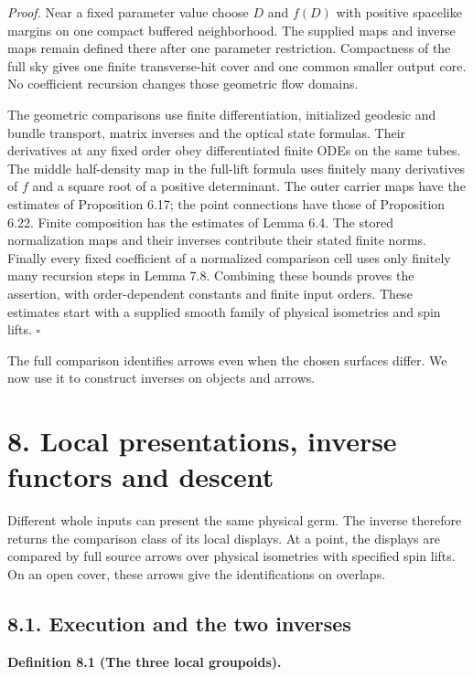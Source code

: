 \documentclass[
  english,
  11pt,
  reqno]{amsart}
\makeatletter
\newcommand{\paperdisplaynext}{%
  \let\paper@savedstartsection\@startsection
  \def\@startsection##1##2##3##4##5##6{%
    \let\@startsection\paper@savedstartsection
    \@tempskipa ##5\relax
    \ifdim\@tempskipa<\z@
      \def\paper@afterskip{.35\baselineskip}%
    \else
      \def\paper@afterskip{##5}%
    \fi
    \@startsection{##1}{##2}{##3}{##4}{\paper@afterskip}{##6}}}
\newcommand{\paperdisplaysection}{\paperdisplaynext\subsection}
\newcommand{\pandocstatementheading}[1]{%
  \par\if@nobreak\else
    \addpenalty{\@beginparpenalty}%
    \addvspace{.5\baselineskip plus .2\baselineskip minus .2\baselineskip}%
  \fi
  {\normalfont\bfseries #1\par}%
  \nobreak\@afterindenttrue\@afterheading
}
\let\paper@displaysection\paperdisplaysection
\renewcommand{\paperdisplaysection}[1]{%
  \let\paper@savedhangfrom\@hangfrom
  \long\def\@hangfrom##1##2{%
    \paper@savedhangfrom{##1}{\paper@headingparagraph##2}}%
  \paper@displaysection{#1}%
  \let\@hangfrom\paper@savedhangfrom}
\makeatother
\begin{document}
\emph{Proof.} Near a fixed parameter value choose \(D\) and \(f(D)\)
with positive spacelike margins on one compact buffered neighborhood.
The supplied maps and inverse maps remain defined there after one
parameter restriction. Compactness of the full sky gives one finite
transverse-hit cover and one common smaller output core. No coefficient
recursion changes those geometric flow domains.

The geometric comparisons use finite differentiation, initialized
geodesic and bundle transport, matrix inverses and the optical state
formulas. Their derivatives at any fixed order obey differentiated
finite ODEs on the same tubes. The middle half-density map in the
full-lift formula uses finitely many derivatives of \(f\) and a square
root of a positive determinant. The outer carrier maps have the
estimates of Proposition 6.17; the point connections have those of
Proposition 6.22. Finite composition has the estimates of Lemma 6.4. The
stored normalization maps and their inverses contribute their stated
finite norms. Finally every fixed coefficient of a normalized comparison
cell uses only finitely many recursion steps in Lemma 7.8. Combining
these bounds proves the assertion, with order-dependent constants and
finite input orders. These estimates start with a supplied smooth family
of physical isometries and spin lifts. \hfill\(\square\)

The full comparison identifies arrows even when the chosen surfaces
differ. We now use it to construct inverses on objects and arrows.

\section{8. Local presentations, inverse functors and
descent}\label{local-presentations-inverse-functors-and-descent}\label{sec:local-source-equivalence}

Different whole inputs can present the same physical germ. The inverse
therefore returns the comparison class of its local displays. At a
point, the displays are compared by full source arrows over physical
isometries with specified spin lifts. On an open cover, these arrows
give the identifications on overlaps.

\paperdisplaysection{8.1. Execution and the two
inverses}\label{execution-and-the-two-inverses}\label{sec:local-display-inverses}

\pandocstatementheading{\leavevmode{}\label{def:local-display-groupoids}Definition 8.1 (The three local groupoids).}
\end{document}
